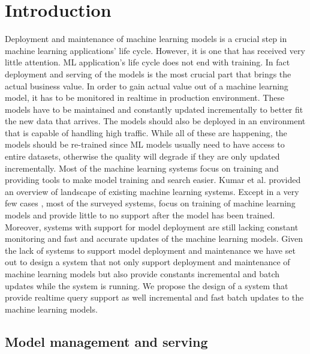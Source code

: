 \documentclass{sig-alternate-05-2015}
\begin{document}
\section{Introduction}
Deployment and maintenance of machine learning models is a crucial step in machine learning applications' life cycle. 
However, it is one that has received very little attention. 
ML application's life cycle does not end with training. 
In fact deployment and serving of the models is the most crucial part that brings the actual business value. 
In order to gain actual value out of a machine learning model, it has to be monitored in realtime in production environment. 
These models have to be maintained and constantly updated incrementally to better fit the new data that arrives. 
The models should also be deployed in an environment that is capable of handling high traffic. 
While all of these are happening, the models should be re-trained since ML models usually need to have access to entire datasets, otherwise the quality will degrade if they are only updated incrementally.
Most of the machine learning systems focus on training and providing tools to make model training and search easier. 
Kumar et al. \cite{kumar2015survey} provided an overview of landscape of existing machine learning systems. 
Except in a very few cases \cite{akdere2011case, crankshaw2014missing}, most of the surveyed systems, focus on training of machine learning models and provide little to no support after the model has been trained.
Moreover, systems with support for model deployment are still lacking constant monitoring and fast and accurate updates of the machine learning models.
Given the lack of systems to support model deployment and maintenance we have set out to design a system that not only support deployment and maintenance of machine learning models but also provide constants incremental and batch updates while the system is running. 
We propose the design of a system that provide realtime query support as well incremental and fast batch updates to the machine learning models.

\subsection{Model management and serving} \label{model-management-serving}

\end{document}
